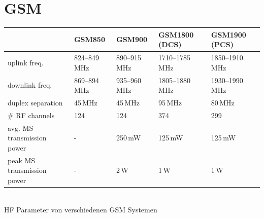 \section{GSM }
	\begin{center}
	\begin{tabular}{|l|l|l|l|l|} \hline
	          & GSM850     & GSM900        & GSM1800 (DCS)       & GSM1900 (PCS) \\ \hline  \hline
	uplink freq.
	   &  824--849\,MHz & 890--915\,MHz & 1710--1785\,MHz & 1850--1910\,MHz \\ \hline
	downlink freq. 
	   & 869–894\,MHz  & 935--960\,MHz & 1805--1880\,MHz & 1930--1990\,MHz \\ \hline
	duplex separation 
	   &  45\,MHz & 45\,MHz & 95\,MHz & 80\,MHz \\ \hline
	\# RF channels 
	   & 124  & 124 & 374 & 299 \\ \hline
	avg. MS transmission power 
	   & - & 250\,mW & 125\,mW & 125\,mW \\ \hline
	peak MS transmission power 
	   & -  & 2\,W & 1\,W & 1\,W \\ \hline
	\end{tabular} \\
	HF Parameter von verschiedenen GSM Systemen
	\end{center}

